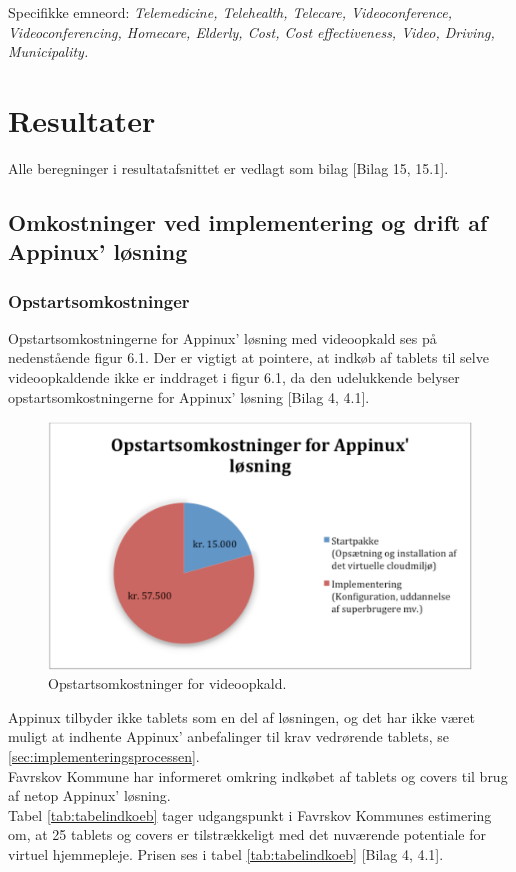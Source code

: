 Specifikke emneord: \textit{Telemedicine, Telehealth, Telecare, Videoconference, Videoconferencing, Homecare, Elderly, Cost, Cost effectiveness, Video, Driving, Municipality.}
  


\section{Resultater}
Alle beregninger i resultatafsnittet er vedlagt som bilag [Bilag 15, 15.1]. 
\subsection{Omkostninger ved implementering og drift af Appinux' løsning}
\subsubsection{Opstartsomkostninger}
Opstartsomkostningerne for Appinux’ løsning med videoopkald ses på nedenstående figur 6.1. Der er vigtigt at pointere, at indkøb af tablets til selve videoopkaldende ikke er inddraget i figur 6.1, da den udelukkende belyser opstartsomkostningerne for Appinux’ løsning [Bilag 4, 4.1].

\begin{figure}[H]
	\centering
	\includegraphics[width=1\textwidth]{Figurer/Skarmbillede_opstart}
	\caption{Opstartsomkostninger for videoopkald.}
\end{figure}

Appinux tilbyder ikke tablets som en del af løsningen, og det har ikke været muligt at indhente Appinux' anbefalinger til krav vedrørende tablets, se \vref{sec:implementeringsprocessen}.\\
Favrskov Kommune har informeret omkring indkøbet af tablets og covers til brug af netop Appinux’ løsning. \\
Tabel \ref{tab:tabelindkoeb} tager udgangspunkt i Favrskov Kommunes estimering om, at 25 tablets og covers er tilstrækkeligt med det nuværende potentiale for virtuel hjemmepleje. Prisen ses i tabel \ref{tab:tabelindkoeb} [Bilag 4, 4.1]. 

